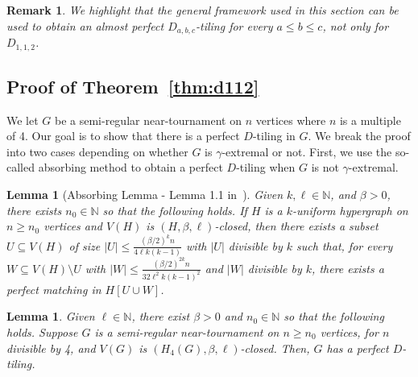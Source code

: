 \documentclass[11pt]{amsart}
\newtheorem{lemma}[theorem]{Lemma}
\newtheorem{remark}[theorem]{Remark}
\def\N{\mathbb{N}}
\begin{document}
\begin{remark}
    We highlight that the general framework used in this section can be used to obtain an almost perfect $D_{a,b,c}$-tiling for every $a\le b \le c$, not only for $D_{1,1,2}$.
\end{remark}

\subsection{Proof of Theorem~\ref{thm:d112}} \label{subsec:overview}

We let $G$ be a semi-regular near-tournament on $n$ vertices where $n$ is a multiple of 4. Our goal is to show that there is a perfect $D$-tiling in $G$. We break the proof into two cases depending on whether $G$ is $\gamma$-extremal or not. 
First, we use the so-called absorbing method to obtain a perfect $D$-tiling when $G$ is not $\gamma$-extremal.

\begin{lemma}[Absorbing Lemma - Lemma 1.1 in~\cite{lo-markstrom}] \label{lem:absorbing}
    Given $k, \ell \in \N$, and $\beta > 0$, there exists $n_0 \in \N$ so that the following holds. If $H$ is a $k$-uniform hypergraph on $n\ge n_0$ vertices and $V(H)$ is $(H, \beta, \ell)$-closed, then there exists a subset $U \subseteq V(H)$ of size $|U| \le \frac{(\beta/2)^{k}n}{4\ell k(k-1)} $ with $|U|$ divisible by $k$ such that, for every $W \subseteq V(H) \setminus U$ with $|W|\le \frac{(\beta/2)^{2k}n}{32\ell^2 k(k-1)^2}$ and $|W|$ divisible by $k$, there exists a perfect matching in $H[U \cup W]$.  
\end{lemma}

\begin{lemma} \label{lem:non_ext}
    Given $\ell \in \N$, there exist $\beta>0$ and $n_0\in \N$ so that the following holds. Suppose $G$ is a semi-regular near-tournament on $n\ge n_0$ vertices, for $n$ divisible by 4, and $V(G)$ is $(H_4(G),\beta,\ell)$-closed. Then, $G$ has a perfect $D$-tiling.
\end{lemma}
\end{document}
